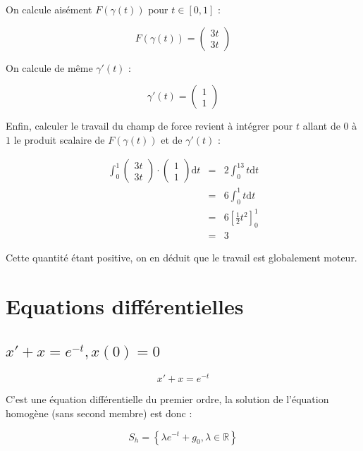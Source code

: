 \documentclass[a4paper, 11pt]{report} %
\newcommand{\dt}{\mathrm{d}t}
\newcommand{\R}{\mathbb{R}}
\begin{document}
On calcule aisément $F(\gamma(t))$ pour $t\in[0,1]$ :

\[
F(\gamma(t)) = \begin{pmatrix}
3t\\
3t
\end{pmatrix}
\]

On calcule de même $\gamma'(t)$ :

\[
\gamma'(t) = \begin{pmatrix}
1\\
1
\end{pmatrix}
\]

Enfin, calculer le travail du champ de force revient à intégrer pour $t$ allant de $0$ à $1$ le produit scalaire de
$F(\gamma(t))$ et de $\gamma'(t)$ :

\begin{eqnarray*}
    \int_0^1
    \begin{pmatrix}
    3t\\
    3t
    \end{pmatrix}
    \cdot
    \begin{pmatrix}
    1\\
    1
    \end{pmatrix}
    \dt
    & = & 2\int_0^13t\dt\\
    & = & 6\int_0^1t\dt\\
    & = & 6\left[\frac{1}{2}t^2\right]_0^1\\
    & = & 3
\end{eqnarray*}

Cette quantité étant positive, on en déduit que le travail est globalement moteur.

\section{Equations différentielles} %

\subsection{$x' + x = e^{-t}, x(0) = 0$} %

\begin{equation}
x' + x = e^{-t}
\label{equa_diff_1}
\end{equation}

C'est une équation différentielle du premier ordre, la solution de l'équation homogène (sans second membre) est donc :

\[
S_h = \left\{\lambda e^{-t} + g_0, \lambda\in\R\right\}
\]
\end{document}
